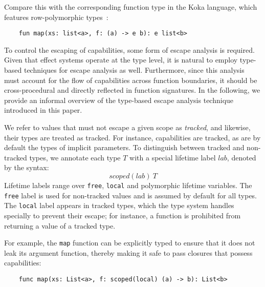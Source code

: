 \documentclass[acmsmall,review,screen]{acmart}
\newcommand{\ap}{~}
\begin{document}
Compare this with the corresponding function type in the Koka language, which features row-polymorphic types~\cite{leijen2014koka}:
\begin{verbatim}
    fun map(xs: list<a>, f: (a) -> e b): e list<b>
\end{verbatim}

To control the escaping of capabilities, some form of escape analysis is required. %
Given that effect systems operate at the type level, it is natural to employ type-based techniques for escape analysis as well.
Furthermore, since this analysis must account for the flow of capabilities across function boundaries, it should be cross-procedural and directly reflected in function signatures.
In the following, we provide an informal overview of the type-based escape analysis technique introduced in this paper.

We refer to values that must not escape a given scope as \textit{tracked}, and likewise, their types are treated as tracked.
For instance, capabilities are tracked, as are by default the types of implicit parameters.
To distinguish between tracked and non-tracked types, we annotate each type $T$ with a special lifetime label $lab$, denoted by the syntax:
\[scoped(lab)\ap T\] %
Lifetime labels range over \texttt{free}, \texttt{local} and polymorphic lifetime variables.
The \texttt{free} label is used for non-tracked values and is assumed by default for all types.
The \texttt{local} label appears in tracked types, which the type system handles specially to prevent their escape; for instance, a function is prohibited from returning a value of a tracked type.

For example, the \texttt{map} function can be explicitly typed to ensure that it does not leak its argument function, thereby making it safe to pass closures that possess capabilities:
\begin{verbatim}
    func map(xs: List<a>, f: scoped(local) (a) -> b): List<b>
\end{verbatim}
\end{document}
